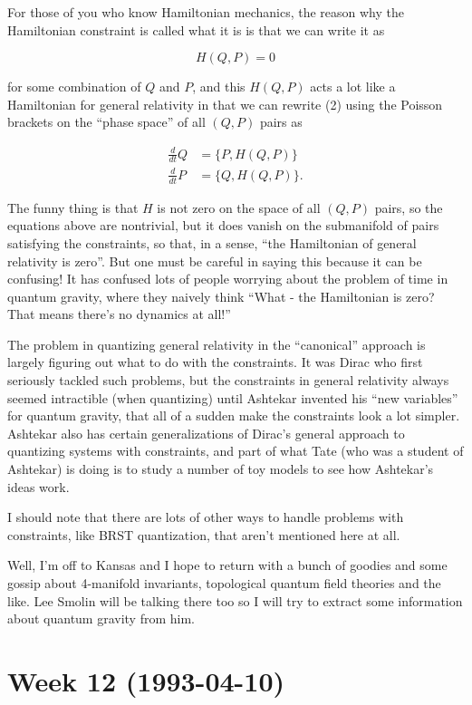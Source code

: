 \documentclass{article}
\begin{document}
For those of you who know Hamiltonian mechanics, the reason why the
Hamiltonian constraint is called what it is is that we can write it as

\[H(Q,P) = 0\]

for some combination of \(Q\) and \(P\), and this \(H(Q,P)\) acts a lot
like a Hamiltonian for general relativity in that we can rewrite (2)
using the Poisson brackets on the ``phase space'' of all \((Q,P)\) pairs
as

\[\begin{aligned}\frac{d}{dt}Q &= \{P,H(Q,P)\} \\ \frac{d}{dt}P &= \{Q,H(Q,P)\}.\end{aligned}\]

The funny thing is that \(H\) is not zero on the space of all \((Q,P)\)
pairs, so the equations above are nontrivial, but it does vanish on the
submanifold of pairs satisfying the constraints, so that, in a sense,
``the Hamiltonian of general relativity is zero''. But one must be
careful in saying this because it can be confusing! It has confused lots
of people worrying about the problem of time in quantum gravity, where
they naively think ``What - the Hamiltonian is zero? That means there's
no dynamics at all!''

The problem in quantizing general relativity in the ``canonical''
approach is largely figuring out what to do with the constraints. It was
Dirac who first seriously tackled such problems, but the constraints in
general relativity always seemed intractible (when quantizing) until
Ashtekar invented his ``new variables'' for quantum gravity, that all of
a sudden make the constraints look a lot simpler. Ashtekar also has
certain generalizations of Dirac's general approach to quantizing
systems with constraints, and part of what Tate (who was a student of
Ashtekar) is doing is to study a number of toy models to see how
Ashtekar's ideas work.

I should note that there are lots of other ways to handle problems with
constraints, like BRST quantization, that aren't mentioned here at all.

Well, I'm off to Kansas and I hope to return with a bunch of goodies and
some gossip about 4-manifold invariants, topological quantum field
theories and the like. Lee Smolin will be talking there too so I will
try to extract some information about quantum gravity from him.
\hypertarget{week-12-1993-04-10}{%
\section{Week 12 (1993-04-10)}\label{week-12-1993-04-10}}
\end{document}
